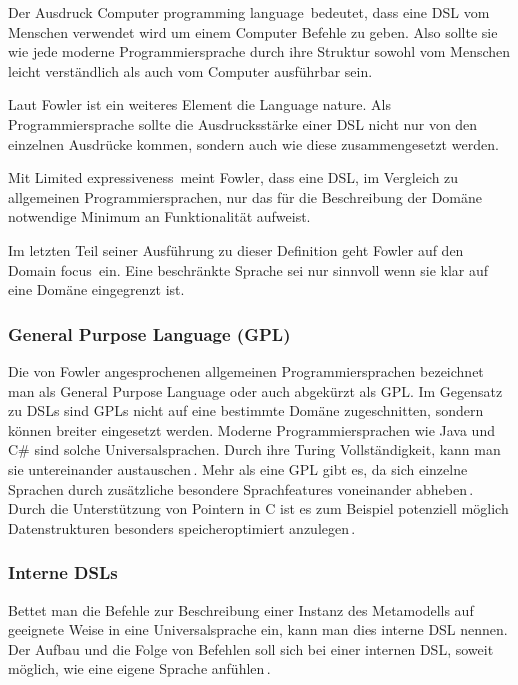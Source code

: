 \documentclass[12pt,oneside,a4paper,parskip]{scrbook}
\begin{document}
Der Ausdruck \glqq Computer programming language\grqq\ bedeutet, dass eine DSL vom Menschen verwendet wird um einem Computer Befehle zu geben. Also sollte sie wie jede moderne Programmiersprache durch ihre Struktur sowohl vom Menschen leicht verständlich als auch vom Computer ausführbar sein.

Laut Fowler ist ein weiteres Element die \glqq Language nature\grqq. Als Programmiersprache sollte die Ausdrucksstärke einer DSL nicht nur von den einzelnen Ausdrücke kommen, sondern auch wie diese zusammengesetzt werden. 

Mit \glqq Limited expressiveness\grqq\ meint Fowler, dass eine DSL, im Vergleich zu allgemeinen Programmiersprachen, nur das für die Beschreibung der Domäne notwendige Minimum an Funktionalität aufweist. 

Im letzten Teil seiner Ausführung zu dieser Definition geht Fowler auf den \glqq Domain focus\grqq\ ein. Eine beschränkte Sprache sei nur sinnvoll wenn sie klar auf eine Domäne eingegrenzt ist.

\subsubsection{General Purpose Language (GPL)}

Die von Fowler angesprochenen allgemeinen Programmiersprachen bezeichnet man als General Purpose Language oder auch abgekürzt als GPL. Im Gegensatz zu DSLs sind GPLs nicht auf eine bestimmte Domäne zugeschnitten, sondern können breiter eingesetzt werden. Moderne Programmiersprachen wie Java und C\# sind solche Universalsprachen. Durch ihre Turing Vollständigkeit, kann man sie untereinander austauschen\,\cite[S. 111]{hromkovic2014}. Mehr als eine GPL gibt es, da sich einzelne Sprachen durch zusätzliche besondere Sprachfeatures voneinander abheben\,\cite[S. 27]{voelter2013}. Durch die Unterstützung von Pointern in C ist es zum Beispiel potenziell möglich Datenstrukturen besonders speicheroptimiert anzulegen\,\cite[S. 93ff.]{kernighan1988}.

\subsubsection{Interne DSLs}

Bettet man die Befehle zur Beschreibung einer Instanz des Metamodells auf geeignete Weise in eine Universalsprache ein, kann man dies interne DSL nennen. Der Aufbau und die Folge von Befehlen soll sich bei einer internen DSL, soweit möglich, wie eine eigene Sprache anfühlen\,\cite[S 28]{fowler2010}.
\end{document}
